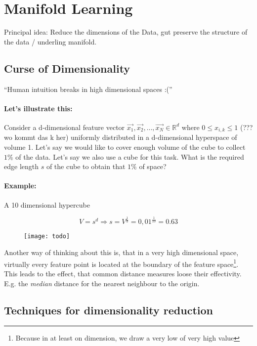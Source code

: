 
\section*{Manifold Learning}
Principal idea: Reduce the dimensions of the Data, gut preserve the structure of the data / underling manifold.

\subsection*{Curse of Dimensionality}
``Human intuition breaks in high dimensional spaces :(''

\paragraph{Let's illustrate this:}
Consider a d-dimensional feature vector $\vec{x_1}, \vec{x_2}, \dots, \vec{x_N} \in \mathbb{R}^d$ where $0 \le x_{i,k} \le 1$ (??? wo kommt das k her) uniformly distributed in a d-dimensional hyperspace of volume 1.
Let's say we would like to cover enough volume of  the cube to collect $1\%$ of the data. Let's say we also use a cube for this task. What is the required edge length $s$ of the cube to obtain that $1\%$ of space?

\paragraph{Example:}
A 10 dimensional hypercube

\begin{equation*}
    V=s^d \Rightarrow s = V^{\frac{1}{d}} = 0,01^{\frac{1}{10}} = 0.63
\end{equation*}

\begin{figure}[H]
	\centering
	\texttt{[image: todo]}
\end{figure}

Another way of thinking about this is, that in a very high dimensional space, virtually every feature point is located at the boundary of the feature space\footnote{Because in at least on dimension, we draw a very low of very high value}. This leads to the effect, that common distance measures loose their  effectivity. E.g. the \textit{median} distance for the nearest neighbour to the origin.

\subsection*{Techniques for dimensionality reduction}
